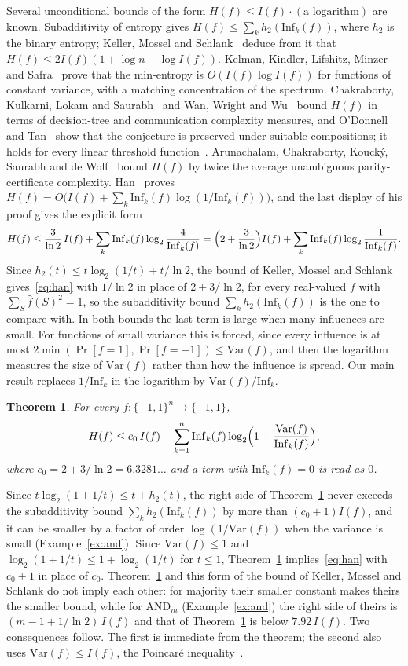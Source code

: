 \documentclass[11pt]{amsart}
\newtheorem{theorem}{Theorem}
\theoremstyle{remark}
\newcommand{\Inf}{\mathrm{Inf}}
\newcommand{\Var}{\mathrm{Var}}
\begin{document}
Several unconditional bounds of the form $H(f)\le I(f)\cdot(\text{a logarithm})$ are known. Subadditivity of
entropy gives $H(f)\le\sum_k h_2(\Inf_k(f))$, where $h_2$ is the binary entropy; Keller, Mossel and
Schlank~\cite{KMS} deduce from it that $H(f)\le 2I(f)(1+\log n-\log I(f))$. Kelman, Kindler, Lifshitz, Minzer
and Safra~\cite{KKLMS} prove that the min-entropy is $O(I(f)\log I(f))$ for functions of constant variance, with a
matching concentration of the spectrum. Chakraborty, Kulkarni, Lokam and Saurabh~\cite{CKLS} and Wan, Wright and
Wu~\cite{WWW} bound $H(f)$ in terms of decision-tree and communication complexity measures, and O'Donnell and
Tan~\cite{OT13} show that the conjecture is preserved under suitable compositions; it holds for every linear
threshold function~\cite{ShmLTF}. Arunachalam, Chakraborty,
Kouck\'y, Saurabh and de Wolf~\cite{ACKSW} bound $H(f)$ by twice the average unambiguous parity-certificate
complexity. Han~\cite[Theorem~1]{Han} proves $H(f)=O\bigl(I(f)+\sum_k\Inf_k(f)\log(1/\Inf_k(f))\bigr)$, and the last
display of his proof gives the explicit form
\begin{equation}\label{eq:han}
H(f)\le\frac{3}{\ln 2}\,I(f)+\sum_k\Inf_k(f)\log_2\frac{4}{\Inf_k(f)}
=\Bigl(2+\frac3{\ln 2}\Bigr)I(f)+\sum_k\Inf_k(f)\log_2\frac1{\Inf_k(f)} .
\end{equation}
Since $h_2(t)\le t\log_2(1/t)+t/\ln 2$, the bound of Keller, Mossel and Schlank~\cite[Claim~4.1]{KMS} gives~\eqref{eq:han}
with $1/\ln 2$ in place of $2+3/\ln 2$, for every
real-valued $f$ with $\sum_S\hat f(S)^2=1$, so the subadditivity bound $\sum_kh_2(\Inf_k(f))$ is the one to compare with.
In both bounds the last term is large when many influences are small. For functions of small variance this is
forced, since every influence is at most $2\min(\Pr[f=1],\Pr[f=-1])\le\Var(f)$, and then the logarithm measures the size of $\Var(f)$ rather than how
the influence is spread. Our main result replaces $1/\Inf_k$ in the logarithm by $\Var(f)/\Inf_k$.

\begin{theorem}\label{thm:main}
For every $f:\{-1,1\}^n\to\{-1,1\}$,
\[
H(f)\le c_0\,I(f)+\sum_{k=1}^n\Inf_k(f)\log_2\Bigl(1+\frac{\Var(f)}{\Inf_k(f)}\Bigr),
\]
where $c_0=2+3/\ln2=6.3281\dots$ and a term with $\Inf_k(f)=0$ is read as $0$.
\end{theorem}

Since $t\log_2(1+1/t)\le t+h_2(t)$, the right side of Theorem~\ref{thm:main} never exceeds the subadditivity bound
$\sum_kh_2(\Inf_k(f))$ by more than $(c_0+1)I(f)$, and it can be smaller by a factor of order $\log(1/\Var(f))$ when the
variance is small (Example~\ref{ex:and}). Since $\Var(f)\le1$ and $\log_2(1+1/t)\le1+\log_2(1/t)$ for $t\le1$, Theorem~\ref{thm:main} implies~\eqref{eq:han}
with $c_0+1$ in place of $c_0$. Theorem~\ref{thm:main} and this form of the bound of Keller, Mossel and Schlank do not imply each
other: for majority their smaller constant makes theirs the smaller bound, while for $\mathrm{AND}_m$
(Example~\ref{ex:and}) the right side of theirs is $(m-1+1/\ln 2)\,I(f)$ and that of Theorem~\ref{thm:main} is below
$7.92\,I(f)$. Two consequences follow. The first is immediate from the theorem; the second also uses
$\Var(f)\le I(f)$, the Poincar\'e inequality~\cite[Chapter~2]{ODo}.
\end{document}
